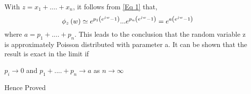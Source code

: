 \documentclass{beamer}
\begin{document}
\begin{frame}{}
     With $z = x_1 + ....+x_n$, it follows from \eqref{Eq 1} that,
    \begin{equation}
        \phi_z\left(w\right) \simeq e^{p_1\left(e^{jw}-1\right)}...e^{p_n\left(e^{jw}-1\right)} = e^{a\left(e^{jw}-1\right)}
    \end{equation}
    where $a = p_1 + ....+p_n$. This leads to the conclusion that the random variable z is approximately Poisson distributed with parameter a. It can be shown that the result is exact in the limit if
    
     $p_i \rightarrow 0$ and $p_1 + ....+p_n \rightarrow a$  as $n \rightarrow \infty$   
     
     Hence Proved
\end{frame}
\end{document}
